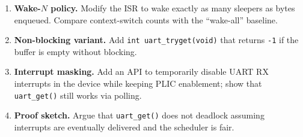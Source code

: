\begin{enumerate}
  \item \textbf{Wake-$N$ policy.} Modify the ISR to wake exactly as many sleepers as bytes enqueued.
        Compare context-switch counts with the “wake-all” baseline.
  \item \textbf{Non-blocking variant.} Add \texttt{int uart\_tryget(void)} that returns \texttt{-1}
        if the buffer is empty without blocking.
  \item \textbf{Interrupt masking.} Add an API to temporarily disable UART RX interrupts in the
        device while keeping PLIC enablement; show that \texttt{uart\_get()} still works via polling.
  \item \textbf{Proof sketch.} Argue that \texttt{uart\_get()} does not deadlock assuming interrupts
        are eventually delivered and the scheduler is fair.
\end{enumerate}
